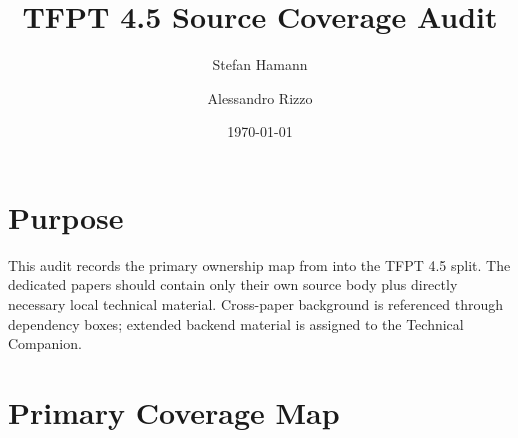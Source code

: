 \documentclass[11pt,a4paper]{article}
\title{\color{tfptblue}\textbf{TFPT 4.5 Source Coverage Audit}}
\author{Stefan Hamann \and Alessandro Rizzo}
\date{\today}
\begin{document}
\maketitle
\section{Purpose}
This audit records the primary ownership map from \sourceDraft{} into the TFPT 4.5 split. The
dedicated papers should contain only their own source body plus directly necessary local technical
material. Cross-paper background is referenced through dependency boxes; extended backend material
is assigned to the Technical Companion.
\section{Primary Coverage Map}
\end{document}

